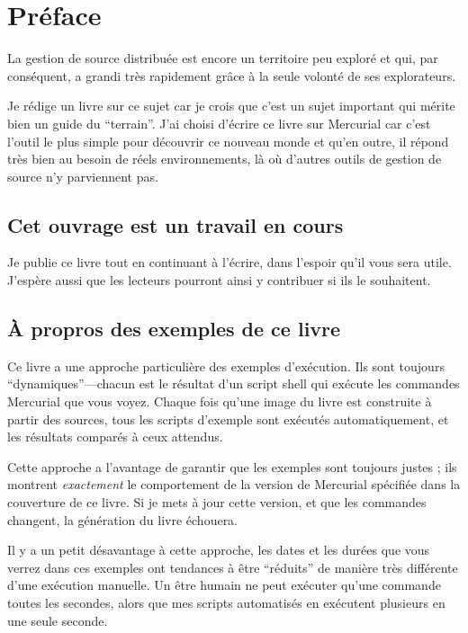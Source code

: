 \chapter*{Préface}
\label{chap:preface}

La gestion de source distribuée est encore un territoire peu exploré
et qui, par conséquent, a grandi très rapidement grâce à la seule 
volonté de ses explorateurs.

Je rédige un livre sur ce sujet car je crois que c'est un sujet 
important qui mérite bien un guide du ``terrain''. J'ai choisi d'écrire
ce livre sur Mercurial car c'est l'outil le plus simple pour découvrir
ce nouveau monde et qu'en outre, il répond très bien au besoin de
réels environnements, là où d'autres outils de gestion de source n'y
parviennent pas.

\section{Cet ouvrage est un travail en cours}

Je publie ce livre tout en continuant à l'écrire, dans l'espoir qu'il
vous sera utile. J'espère aussi que les lecteurs pourront ainsi y contribuer
si ils le souhaitent.

\section{À propros des exemples de ce livre}

Ce livre a une approche particulière des exemples d'exécution. Ils sont 
toujours ``dynamiques''---chacun est le résultat d'un script shell qui
exécute les commandes Mercurial que vous voyez. Chaque fois qu'une 
image du livre est construite à partir des sources, tous les scripts d'exemple
sont exécutés automatiquement, et les résultats comparés à ceux attendus.

Cette approche a l'avantage de garantir que les exemples sont toujours
justes ; ils montrent \emph{exactement} le comportement de la version de
Mercurial spécifiée dans la couverture de ce livre. Si je mets à jour cette
version, et que les commandes changent, la génération du livre échouera.

Il y a un petit désavantage à cette approche, les dates et les
durées que vous verrez dans ces exemples ont tendances à être
``réduits'' de manière très différente d'une exécution manuelle. Un être humain
ne peut exécuter qu'une commande toutes les secondes, alors que mes scripts
automatisés en exécutent plusieurs en une seule seconde.

